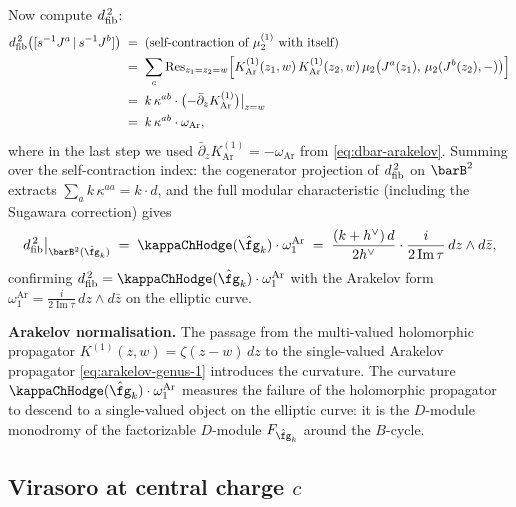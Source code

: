 \begin{example}
Now compute $d_{\mathrm{fib}}^{\,2}$:
\begin{align}\label{eq:dfib-sq-affine}
 d_{\mathrm{fib}}^{\,2}\bigl([s^{-1}J^a \,|\, s^{-1}J^b]\bigr)
 &\;=\;
 \text{(self-contraction of $\mu_2^{(1)}$ with itself)}
 \notag\\
 &\;=\;
 \sum_c
 \operatorname{Res}_{z_1=z_2=w}\Bigl[
 K^{(1)}_{\mathrm{Ar}}(z_1,w)\,
 K^{(1)}_{\mathrm{Ar}}(z_2,w)\,
 \mu_2\bigl(J^a(z_1),\, \mu_2(J^b(z_2), -)\bigr)
 \Bigr]
 \notag\\
 &\;=\;
 k\,\kappa^{ab} \cdot
 \bigl(-\bar\partial_z K^{(1)}_{\mathrm{Ar}}\bigr)\big|_{z=w}
 \notag\\
 &\;=\;
 k\,\kappa^{ab} \cdot \omega_{\mathrm{Ar}},
\end{align}
where in the last step we used $\bar\partial_z K^{(1)}_{\mathrm{Ar}}
= -\omega_{\mathrm{Ar}}$ from \eqref{eq:dbar-arakelov}. Summing
over the self-contraction index: the cogenerator projection of
$d_{\mathrm{fib}}^{\,2}$ on $\barB^2$ extracts $\sum_a k\,\kappa^{aa} =
k \cdot d$, and the full modular characteristic (including the
Sugawara correction) gives
\[
 \dfib^{\,2}\big|_{\barB^2(\hat\fg_k)}
 \;=\;
 \kappaChHodge(\hat\fg_k) \cdot \omega_1^{\mathrm{Ar}}
 \;=\;
 \frac{(k+h^\vee)\,d}{2h^\vee} \cdot
 \frac{i}{2\operatorname{Im}\tau}\,
 dz \wedge d\bar z,
\]
confirming $\dfib^{\,2} = \kappaChHodge(\hat\fg_k)\cdot\omega_1^{\mathrm{Ar}}$ with the
Arakelov form $\omega_1^{\mathrm{Ar}} = \frac{i}{2\operatorname{Im}\tau}\,
dz \wedge d\bar z$ on the elliptic curve.

\smallskip\noindent
\textbf{Arakelov normalisation.}
The passage from the multi-valued holomorphic propagator
$K^{(1)}(z,w) = \zeta(z-w)\,dz$ to the single-valued Arakelov
propagator \eqref{eq:arakelov-genus-1} introduces the curvature.
The curvature $\kappaChHodge(\hat\fg_k)\cdot\omega_1^{\mathrm{Ar}}$ measures the
failure of the holomorphic propagator to descend to a single-valued
object on the elliptic curve: it is the $D$-module monodromy of the
factorizable $D$-module $F_{\hat\fg_k}$ around the $B$-cycle.
\end{example}

\subsection{Virasoro at central charge $c$}
\label{subsec:virasoro-SC}

